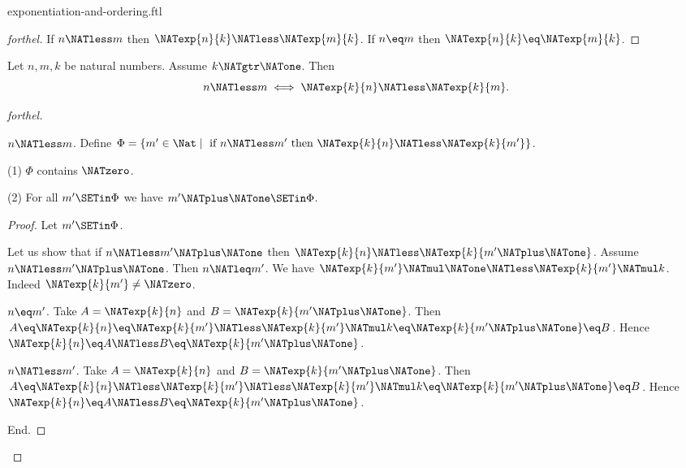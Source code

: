 \documentclass{naproche-library}
\begin{document}
\begin{smodule}[title=Exponentiation and Ordering]{exponentiation-and-ordering.ftl}
\begin{proof}[forthel]
  If $n \NATless m$ then $\NATexp{n}{k} \NATless \NATexp{m}{k}$.
  If $n \eq m$ then $\NATexp{n}{k} \eq \NATexp{m}{k}$.
\end{proof}

\begin{proposition}[forthel,id=ARITHMETIC_09_3349764703780864]
  Let $n, m, k$ be natural numbers.
  Assume $k \NATgtr \NATone$.
  Then \[ n \NATless m \iff \NATexp{k}{n} \NATless \NATexp{k}{m}. \]
\end{proposition}
\begin{proof}[forthel]
  \begin{case}{$n \NATless m$.}
    Define $\Phi = \{ m' \in \Nat \mid\text{ if }n \NATless m'\text{ then }\NATexp{k}{n} \NATless \NATexp{k}{m'} \}$.

    (1) $\Phi$ contains $\NATzero$.

    (2) For all $m' \SETin \Phi$ we have $m' \NATplus \NATone \SETin \Phi$.
    \begin{proof}
      Let $m' \SETin \Phi$.

      Let us show that if $n \NATless m' \NATplus \NATone$ then $\NATexp{k}{n} \NATless \NATexp{k}{m' \NATplus \NATone}$.
        Assume $n \NATless m' \NATplus \NATone$.
        Then $n \NATleq m'$.
        We have $\NATexp{k}{m'} \NATmul \NATone \NATless \NATexp{k}{m'} \NATmul k$.
        Indeed $\NATexp{k}{m'} \neq \NATzero$.

        \begin{case}{$n \eq m'$.}
          Take $A = \NATexp{k}{n}$ and $B = \NATexp{k}{m' \NATplus \NATone}$. %
          Then $A
            \eq \NATexp{k}{n}
            \eq \NATexp{k}{m'}
            \NATless \NATexp{k}{m'} \NATmul k
            \eq \NATexp{k}{m' \NATplus \NATone}
            \eq B$.
          Hence $\NATexp{k}{n} \eq A \NATless B \eq \NATexp{k}{m' \NATplus \NATone}$.
        \end{case}

        \begin{case}{$n \NATless m'$.}
          Take $A = \NATexp{k}{n}$ and $B = \NATexp{k}{m' \NATplus \NATone}$. %
          Then $A
            \eq \NATexp{k}{n}
            \NATless \NATexp{k}{m'}
            \NATless \NATexp{k}{m'} \NATmul k
            \eq \NATexp{k}{m' \NATplus \NATone}
            \eq B$.
          Hence $\NATexp{k}{n} \eq A \NATless B \eq \NATexp{k}{m' \NATplus \NATone}$.
        \end{case}
      End.
    \end{proof}


\end{case}
\end{proof}
\end{smodule}
\end{document}
